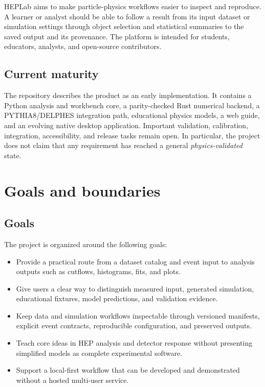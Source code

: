 \documentclass[11pt,a4paper]{article}
\begin{document}
HEPLab aims to make particle-physics workflows easier to inspect and reproduce.
A learner or analyst should be able to follow a result from its input dataset
or simulation settings through object selection and statistical summaries to
the saved output and its provenance. The platform is intended for students,
educators, analysts, and open-source contributors.

\subsection{Current maturity}

The repository describes the product as an early implementation. It contains a
Python analysis and workbench core, a parity-checked Rust numerical backend, a
PYTHIA8/DELPHES integration path, educational physics models, a web guide, and
an evolving native desktop application. Important validation, calibration,
integration, accessibility, and release tasks remain open. In particular,
the project does not claim that any requirement has reached a general
\emph{physics-validated} state.

\section{Goals and boundaries}

\subsection{Goals}

The project is organized around the following goals:

\begin{itemize}
  \item Provide a practical route from a dataset catalog and event input to
  analysis outputs such as cutflows, histograms, fits, and plots.
  \item Give users a clear way to distinguish measured input, generated
  simulation, educational fixtures, model predictions, and validation
  evidence.
  \item Keep data and simulation workflows inspectable through versioned
  manifests, explicit event contracts, reproducible configuration, and
  preserved outputs.
  \item Teach core ideas in HEP analysis and detector response without
  presenting simplified models as complete experimental software.
  \item Support a local-first workflow that can be developed and demonstrated
  without a hosted multi-user service.
\end{itemize}
\end{document}
